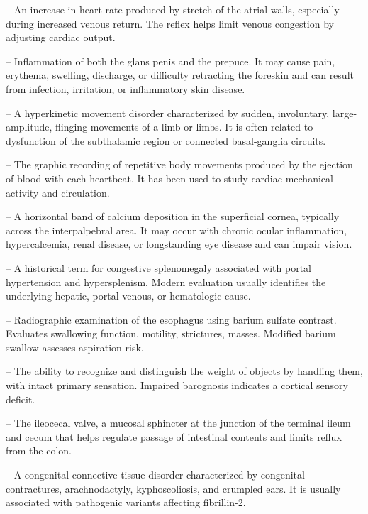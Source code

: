 -- An increase in heart rate produced by stretch of the atrial walls, especially during increased venous return. The reflex helps limit venous congestion by adjusting cardiac output.

-- Inflammation of both the glans penis and the prepuce. It may cause pain, erythema, swelling, discharge, or difficulty retracting the foreskin and can result from infection, irritation, or inflammatory skin disease.

-- A hyperkinetic movement disorder characterized by sudden, involuntary, large-amplitude, flinging movements of a limb or limbs. It is often related to dysfunction of the subthalamic region or connected basal-ganglia circuits.


-- The graphic recording of repetitive body movements produced by the ejection of blood with each heartbeat. It has been used to study cardiac mechanical activity and circulation.

-- A horizontal band of calcium deposition in the superficial cornea, typically across the interpalpebral area. It may occur with chronic ocular inflammation, hypercalcemia, renal disease, or longstanding eye disease and can impair vision.

-- A historical term for congestive splenomegaly associated with portal hypertension and hypersplenism. Modern evaluation usually identifies the underlying hepatic, portal-venous, or hematologic cause.

-- Radiographic examination of the esophagus using barium sulfate contrast. Evaluates swallowing function, motility, strictures, masses. Modified barium swallow assesses aspiration risk.

-- The ability to recognize and distinguish the weight of objects by handling them, with intact primary sensation. Impaired barognosis indicates a cortical sensory deficit.

-- The ileocecal valve, a mucosal sphincter at the junction of the terminal ileum and cecum that helps regulate passage of intestinal contents and limits reflux from the colon.

-- A congenital connective-tissue disorder characterized by congenital contractures, arachnodactyly, kyphoscoliosis, and crumpled ears. It is usually associated with pathogenic variants affecting fibrillin-2.

